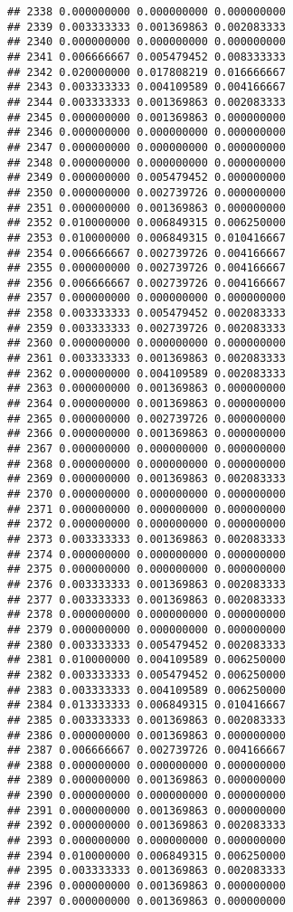 \documentclass[
]{article}
\begin{document}
\begin{verbatim}
## 2338 0.000000000 0.000000000 0.000000000
## 2339 0.003333333 0.001369863 0.002083333
## 2340 0.000000000 0.000000000 0.000000000
## 2341 0.006666667 0.005479452 0.008333333
## 2342 0.020000000 0.017808219 0.016666667
## 2343 0.003333333 0.004109589 0.004166667
## 2344 0.003333333 0.001369863 0.002083333
## 2345 0.000000000 0.001369863 0.000000000
## 2346 0.000000000 0.000000000 0.000000000
## 2347 0.000000000 0.000000000 0.000000000
## 2348 0.000000000 0.000000000 0.000000000
## 2349 0.000000000 0.005479452 0.000000000
## 2350 0.000000000 0.002739726 0.000000000
## 2351 0.000000000 0.001369863 0.000000000
## 2352 0.010000000 0.006849315 0.006250000
## 2353 0.010000000 0.006849315 0.010416667
## 2354 0.006666667 0.002739726 0.004166667
## 2355 0.000000000 0.002739726 0.004166667
## 2356 0.006666667 0.002739726 0.004166667
## 2357 0.000000000 0.000000000 0.000000000
## 2358 0.003333333 0.005479452 0.002083333
## 2359 0.003333333 0.002739726 0.002083333
## 2360 0.000000000 0.000000000 0.000000000
## 2361 0.003333333 0.001369863 0.002083333
## 2362 0.000000000 0.004109589 0.002083333
## 2363 0.000000000 0.001369863 0.000000000
## 2364 0.000000000 0.001369863 0.000000000
## 2365 0.000000000 0.002739726 0.000000000
## 2366 0.000000000 0.001369863 0.000000000
## 2367 0.000000000 0.000000000 0.000000000
## 2368 0.000000000 0.000000000 0.000000000
## 2369 0.000000000 0.001369863 0.002083333
## 2370 0.000000000 0.000000000 0.000000000
## 2371 0.000000000 0.000000000 0.000000000
## 2372 0.000000000 0.000000000 0.000000000
## 2373 0.003333333 0.001369863 0.002083333
## 2374 0.000000000 0.000000000 0.000000000
## 2375 0.000000000 0.000000000 0.000000000
## 2376 0.003333333 0.001369863 0.002083333
## 2377 0.003333333 0.001369863 0.002083333
## 2378 0.000000000 0.000000000 0.000000000
## 2379 0.000000000 0.000000000 0.000000000
## 2380 0.003333333 0.005479452 0.002083333
## 2381 0.010000000 0.004109589 0.006250000
## 2382 0.003333333 0.005479452 0.006250000
## 2383 0.003333333 0.004109589 0.006250000
## 2384 0.013333333 0.006849315 0.010416667
## 2385 0.003333333 0.001369863 0.002083333
## 2386 0.000000000 0.001369863 0.000000000
## 2387 0.006666667 0.002739726 0.004166667
## 2388 0.000000000 0.000000000 0.000000000
## 2389 0.000000000 0.001369863 0.000000000
## 2390 0.000000000 0.000000000 0.000000000
## 2391 0.000000000 0.001369863 0.000000000
## 2392 0.000000000 0.001369863 0.002083333
## 2393 0.000000000 0.000000000 0.000000000
## 2394 0.010000000 0.006849315 0.006250000
## 2395 0.003333333 0.001369863 0.002083333
## 2396 0.000000000 0.001369863 0.000000000
## 2397 0.000000000 0.001369863 0.000000000

\end{verbatim}
\end{document}
